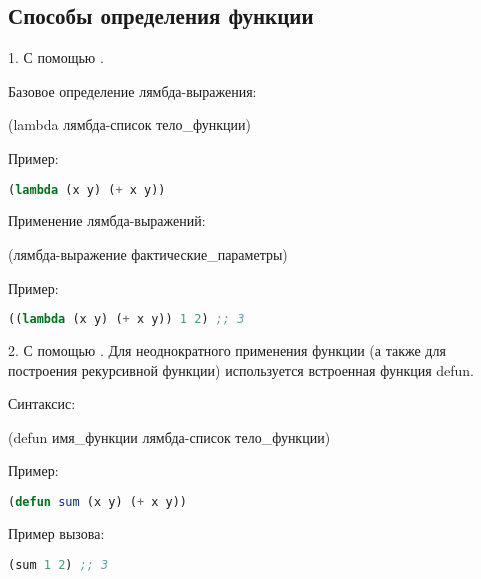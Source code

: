 \documentclass[a4paper,oneside,12pt]{extreport}
\begin{document}
\subsection*{Способы определения функции}


1. С помощью . 

Базовое определение лямбда-выражения:

(lambda лямбда-список тело\_функции)

Пример:

\begin{lstlisting}[language=Lisp]
(lambda (x y) (+ x y))
\end{lstlisting}

Применение лямбда-выражений:

(лямбда-выражение фактические\_параметры)

Пример:

\begin{lstlisting}[language=Lisp]
((lambda (x y) (+ x y)) 1 2) ;; 3
\end{lstlisting}


2. С помощью . 
Для неоднократного применения функции (а также для построения
рекурсивной функции) используется встроенная функция defun.

Синтаксис:

(defun имя\_функции лямбда-список тело\_функции)

Пример:

\begin{lstlisting}[language=Lisp]
(defun sum (x y) (+ x y))
\end{lstlisting}

Пример вызова:

\begin{lstlisting}[language=Lisp]
(sum 1 2) ;; 3
\end{lstlisting}
\end{document}
